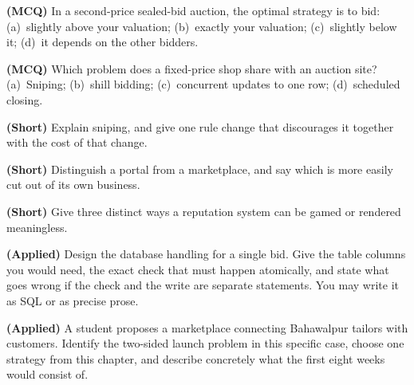 \begin{reviewq}
  \item \textbf{(MCQ)} In a second-price sealed-bid auction, the optimal
        strategy is to bid: (a)~slightly above your valuation; (b)~exactly your
        valuation; (c)~slightly below it; (d)~it depends on the other bidders.
  \item \textbf{(MCQ)} Which problem does a fixed-price shop share with an
        auction site? (a)~Sniping; (b)~shill bidding; (c)~concurrent updates to
        one row; (d)~scheduled closing.
  \item \textbf{(Short)} Explain sniping, and give one rule change that
        discourages it together with the cost of that change.
  \item \textbf{(Short)} Distinguish a portal from a marketplace, and say which
        is more easily cut out of its own business.
  \item \textbf{(Short)} Give three distinct ways a reputation system can be
        gamed or rendered meaningless.
  \item \textbf{(Applied)} Design the database handling for a single bid.
        Give the table columns you would need, the exact check that must happen
        atomically, and state what goes wrong if the check and the write are
        separate statements. You may write it as SQL or as precise prose.
  \item \textbf{(Applied)} A student proposes a marketplace connecting
        Bahawalpur tailors with customers. Identify the two-sided launch
        problem in this specific case, choose one strategy from this chapter,
        and describe concretely what the first eight weeks would consist of.
\end{reviewq}
